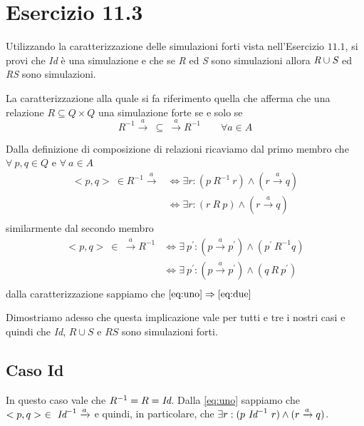 		\newpage
		
	\section{Esercizio 11.3}
		Utilizzando la caratterizzazione delle simulazioni forti vista
		nell'Esercizio $11.1$, si provi che \emph{Id} \`e una simulazione e che se
		\emph{R} ed \emph{S} sono simulazioni allora $\emph{R} \cup \emph{S}$ ed
		\emph{RS} sono simulazioni.
		
		\sectionline
		La caratterizzazione alla quale si fa riferimento \eacc quella che afferma che una relazione $R \subseteq Q \times Q$ \eacc una simulazione forte se e solo se $$R^{-1} \xrightarrow{a} \ \subseteq \ \xrightarrow{a}R^{-1} \qquad \forall a \in A$$
		
		Dalla definizione di composizione di relazioni ricaviamo dal primo membro che $\forall \ p,q \in Q$ e $\forall \ a \in A$
		\begin{equation}
		\label{eq:uno}
		\begin{aligned}
		<p,q>\ \in R^{-1}\xrightarrow{a} & \Leftrightarrow \exists r: (p \ R^{-1} \ r) \land (r \xrightarrow{a} q)\\
		& \Leftrightarrow \exists r: (r \ R \ p) \land (r \xrightarrow{a} q)\\
		\end{aligned}
		\end{equation}
		similarmente dal secondo membro
		\begin{equation}
		\label{eq:due}
		\begin{aligned}
		<p,q>\ \in \ \xrightarrow{a} R^{-1} & \Leftrightarrow \exists \ p^{'}: (p \xrightarrow{a} p^{'}) \land (p^{'} \ R^{-1} q)\\
		& \Leftrightarrow \exists \ p^{'}: (p \xrightarrow{a} p^{'}) \land (q \ R \ p^{'})\\
		\end{aligned}
		\end{equation}
		dalla caratterizzazione sappiamo che $\eqref{eq:uno} \Rightarrow \eqref{eq:due}$
		
		Dimostriamo adesso che questa implicazione vale per tutti e tre i nostri casi e quindi che \emph{Id}, $R\cup S$ e $RS$ sono simulazioni forti.
		
		\subsection{Caso Id}
		
		In questo caso vale che $R^{-1} = R = \emph{Id}$. Dalla \eqref{eq:uno} sappiamo che $<p,q>\ \in \ \emph{Id}^{-1} \xrightarrow{a}$ e quindi, in particolare, che $\exists r: (p \ \emph{Id}^{-1} \ r) \land (r \xrightarrow{a} q)$.
		

